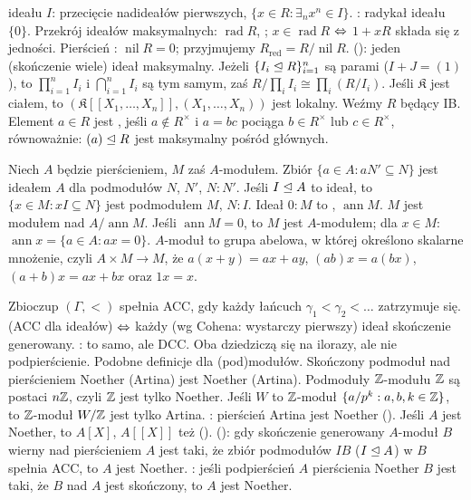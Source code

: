   ideału $I$: przecięcie nadideałów pierwszych, $\{x \in R: \exists_n x^n \in I \}$.
: radykał ideału $\{0\}$.
Przekrój ideałów maksymalnych: $\operatorname{rad} R$, ; $x \in \operatorname{rad} R$ $\Leftrightarrow$ $1 + xR$ składa się z jedności.
Pierścień : $\operatorname{nil} R = 0$; przyjmujemy $R_{\textrm{red}} = R {/} \operatorname{nil} R$.
 (): jeden (skończenie wiele) ideał maksymalny.
Jeżeli $\{I_i \trianglelefteq R\}_{i=1}^n$ są parami  ($I + J = (1)$), to $\prod_{i=1}^n I_i$ i $\bigcap_{i=1}^n I_i$ są tym samym, zaś $R / \prod_i I_i \cong \prod_i (R/I_i)$.
Jeśli $\mathfrak K$ jest ciałem, to $(\mathfrak K [[X_1, \ldots, X_n]], (X_1, \ldots, X_n))$ jest lokalny.
Weźmy $R$ będący IB.
Element $a \in R$ jest , jeśli $a \not\in R^\times$ i $a = bc$ pociąga $b \in R^\times$ lub $c \in R^\times$, równoważnie: $(a) \trianglelefteq R$ jest maksymalny pośród głównych.

Niech  $A$ będzie pierścieniem, $M$ zaś $A$-modułem.
Zbiór $\{a \in A : a N' \subseteq N\}$ jest ideałem $A$ dla podmodułów $N$, $N'$, $N : N'$.
Jeśli $I \trianglelefteq A$ to ideał, to $\{x \in M : xI \subseteq N\}$ jest podmodułem $M$, $N : I$.
Ideał $0 : M$ to , $\operatorname{ann} M$.
$M$ jest modułem nad $A / \operatorname{ann} M$.
Jeśli $\operatorname{ann} M = 0$, to $M$ jest  $A$-modułem; dla $x \in M$: $\operatorname{ann} x = \{a \in A : ax = 0\}$.
$A$-moduł to grupa abelowa, w której określono skalarne mnożenie, czyli $A \times M \to M$, że $a(x+y) = ax + ay$, $(ab)x = a(bx)$, $(a+b)x = ax + bx$ oraz $1 x = x$.

Zbioczup  $(\Gamma, <)$ spełnia ACC, gdy każdy łańcuch $\gamma_1 < \gamma_2 < \ldots$ zatrzymuje się.
 (ACC dla ideałów) $\Leftrightarrow$ każdy (wg Cohena: wystarczy pierwszy) ideał skończenie generowany.
: to samo, ale DCC.
Oba dziedziczą się na ilorazy, ale nie podpierścienie.
Podobne definicje dla (pod)modułów.
Skończony podmoduł nad pierścieniem Noether (Artina) jest Noether (Artina).
Podmoduły $\mathbb{Z}$-modułu $\mathbb{Z}$ są postaci $n\mathbb{Z}$, czyli $\mathbb{Z}$ jest tylko Noether.
Jeśli $W$ to $\mathbb{Z}$-moduł $\{a/p^k : a,b, k \in \mathbb{Z}\}$, to $\mathbb{Z}$-moduł $W/\mathbb{Z}$ jest tylko Artina.
: pierścień Artina jest Noether ().
Jeśli $A$ jest Noether, to $A[X]$, $A[[X]]$ też ().
 (): gdy skończenie generowany $A$-moduł $B$ wierny nad pierścieniem  $A$ jest taki, że zbiór podmodułów $IB$ ($I \trianglelefteq A$) w $B$ spełnia ACC, to $A$ jest Noether.
: jeśli podpierścień $A$ pierścienia Noether $B$ jest taki, że $B$ nad $A$ jest skończony, to $A$ jest Noether.